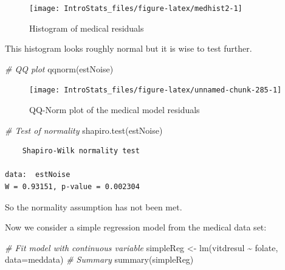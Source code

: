 \documentclass[
  oneside]{krantz}
\newenvironment{Shaded}{\begin{snugshade}}{\end{snugshade}}
\newcommand{\AttributeTok}[1]{\textcolor[rgb]{0.77,0.63,0.00}{#1}}
\newcommand{\CommentTok}[1]{\textcolor[rgb]{0.56,0.35,0.01}{\textit{#1}}}
\newcommand{\FunctionTok}[1]{\textcolor[rgb]{0.00,0.00,0.00}{#1}}
\newcommand{\NormalTok}[1]{#1}
\newcommand{\OtherTok}[1]{\textcolor[rgb]{0.56,0.35,0.01}{#1}}
\newcommand{\SpecialCharTok}[1]{\textcolor[rgb]{0.00,0.00,0.00}{#1}}
\begin{document}
\begin{figure}

{\centering \texttt{[image: IntroStats\_files/figure-latex/medhist2-1]} 

}

\caption{Histogram of medical residuals}\label{fig:medhist2}
\end{figure}

This histogram looks roughly normal but it is wise to test further.

\begin{Shaded}
\begin{Highlighting}[]
\CommentTok{\# QQ plot}
\FunctionTok{qqnorm}\NormalTok{(estNoise)}
\end{Highlighting}
\end{Shaded}

\begin{figure}

{\centering \texttt{[image: IntroStats\_files/figure-latex/unnamed-chunk-285-1]} 

}

\caption{QQ-Norm plot of the medical model residuals}\label{fig:unnamed-chunk-285}
\end{figure}

\begin{Shaded}
\begin{Highlighting}[]
\CommentTok{\# Test of normality}
\FunctionTok{shapiro.test}\NormalTok{(estNoise)}
\end{Highlighting}
\end{Shaded}

\begin{verbatim}
    Shapiro-Wilk normality test

data:  estNoise
W = 0.93151, p-value = 0.002304
\end{verbatim}

So the normality assumption has not been met.

Now we consider a simple regression model from the medical data set:

\begin{Shaded}
\begin{Highlighting}[]
\CommentTok{\# Fit model with continuous variable}
\NormalTok{simpleReg }\OtherTok{\textless{}{-}} \FunctionTok{lm}\NormalTok{(vitdresul }\SpecialCharTok{\textasciitilde{}}\NormalTok{ folate, }\AttributeTok{data=}\NormalTok{meddata)}
\CommentTok{\# Summary}
\FunctionTok{summary}\NormalTok{(simpleReg)}
\end{Highlighting}
\end{Shaded}
\end{document}
